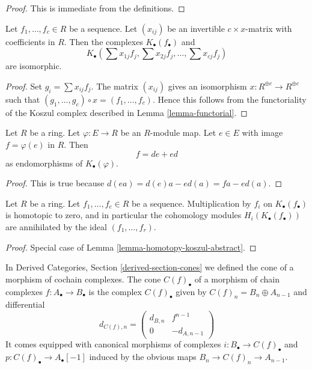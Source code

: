 \begin{proof}
This is immediate from the definitions.
\end{proof}

\begin{lemma}
\label{lemma-change-basis}
Let $f_1, \ldots, f_c \in R$ be a sequence.
Let $(x_{ij})$ be an invertible $c \times x$-matrix with
coefficients in $R$. Then the complexes
$K_\bullet(f_\bullet)$ and
$$
K_\bullet(\sum x_{1j}f_j, \sum x_{2j}f_j, \ldots, \sum x_{cj}f_j)
$$
are isomorphic.
\end{lemma}

\begin{proof}
Set $g_i = \sum x_{ij}f_j$.
The matrix $(x_{ij})$ gives an isomorphism $x : R^{\oplus c} \to R^{\oplus c}$
such that $(g_1, \ldots, g_c) \circ x = (f_1, \ldots, f_c)$.
Hence this follows from the functoriality of the Koszul complex
described in
Lemma \ref{lemma-functorial}.
\end{proof}

\begin{lemma}
\label{lemma-homotopy-koszul-abstract}
Let $R$ be a ring. Let $\varphi : E \to R$ be an $R$-module map.
Let $e \in E$ with image $f = \varphi(e)$ in $R$. Then
$$
f = de + ed
$$
as endomorphisms of $K_\bullet(\varphi)$.
\end{lemma}

\begin{proof}
This is true because $d(ea) = d(e)a - ed(a) = fa - ed(a)$.
\end{proof}

\begin{lemma}
\label{lemma-homotopy-koszul}
Let $R$ be a ring. Let $f_1, \ldots, f_c \in R$ be a sequence.
Multiplication by $f_i$ on $K_\bullet(f_\bullet)$ is homotopic to
zero, and in particular the cohomology modules $H_i(K_\bullet(f_\bullet))$
are annihilated by the ideal $(f_1, \ldots, f_r)$.
\end{lemma}

\begin{proof}
Special case of
Lemma \ref{lemma-homotopy-koszul-abstract}.
\end{proof}

\noindent
In
Derived Categories, Section \ref{derived-section-cones}
we defined the cone of a morphism of cochain complexes.
The cone $C(f)_\bullet$ of a morphism of chain complexes
$f : A_\bullet \to B_\bullet$ is the complex $C(f)_\bullet$ given by
$C(f)_n = B_n \oplus A_{n - 1}$ and differential
\begin{equation}
\label{equation-differential-cone}
d_{C(f), n} =
\left(
\begin{matrix}
d_{B, n} & f^{n - 1} \\
0 & -d_{A, n - 1}
\end{matrix}
\right)
\end{equation}
It comes equipped with canonical morphisms of complexes
$i : B_\bullet \to C(f)_\bullet$ and
$p : C(f)_\bullet \to A_\bullet[-1]$
induced by the obvious maps $B_n \to C(f)_n \to A_{n - 1}$.

